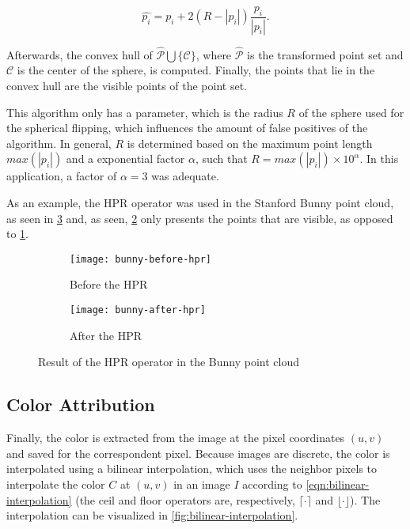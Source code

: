 \begin{equation}
    \label{eqn:spherical-flipping}
    \hat{p_i} = p_i + 2 (R - |p_i|) \frac{p_i}{|p_i|}.
\end{equation}

Afterwards, the convex hull of $\hat{\mathcal{P}} \bigcup \{\mathcal{C}\}$, where $\hat{\mathcal{P}}$ is the transformed point set and $\mathcal{C}$ is the center of the sphere, is computed. Finally, the points that lie in the convex hull are the visible points of the point set.

This algorithm only has a parameter, which is the radius $R$ of the sphere used for the spherical flipping, which influences the amount of false positives of the algorithm. In general, $R$ is determined based on the maximum point length $max(|p_i|)$ and a exponential factor $\alpha$, such that $R = max(|p_i|) \times 10^{\alpha}$. In this application, a factor of $\alpha = 3$ was adequate.

As an example, the HPR operator was used in the Stanford Bunny point cloud, as seen in \cref{fig:hpr-operator-bunny} and, as seen, \cref{fig:after-hpr} only presents the points that are visible, as opposed to \cref{fig:before-hpr}.

\begin{figure}[h]
    
    \centering
    \begin{subfigure}{0.5\textwidth}
        \centering
        \texttt{[image: bunny-before-hpr]}
        \caption{Before the HPR}
        \label{fig:before-hpr}
    \end{subfigure}%
    \begin{subfigure}{0.5\textwidth}
        \centering
        \texttt{[image: bunny-after-hpr]}
        \caption{After the HPR}
        \label{fig:after-hpr}
    \end{subfigure}

    \caption{Result of the HPR operator in the Bunny point cloud}
    \label{fig:hpr-operator-bunny}

\end{figure}

\subsection{Color Attribution}

\newcommand\ceil[1]{\lceil #1 \rceil}
\newcommand\floor[1]{\lfloor #1 \rfloor}

Finally, the color is extracted from the image at the pixel coordinates $(u, v)$ and saved for the correspondent pixel. Because images are discrete, the color is interpolated using a bilinear interpolation, which uses the neighbor pixels to interpolate the color $C$ at $(u, v)$ in an image $I$ according to \cref{eqn:bilinear-interpolation} (the ceil and floor operators are, respectively, $\ceil{\cdot}$ and $\floor{\cdot}$). The interpolation can be visualized in \cref{fig:bilinear-interpolation}.

